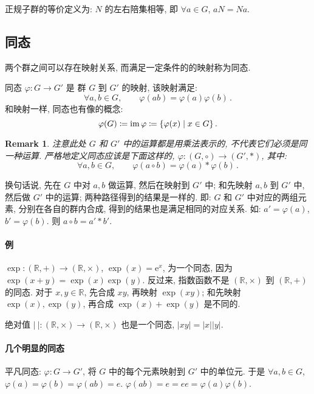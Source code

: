 \documentclass[UTF8]{ctexart}
\theoremstyle{mystyle}
\theoremstyle{myremark}
\newtheorem*{remark}{Remark}
\theoremstyle{plain}
\newcommand{\mr}{\mathrm}
\newcommand{\R}{\mathbb R}
\DeclareMathOperator{\im}{im}
\DeclarePairedDelimiter\set{\{}{\}}
\begin{document}
正规子群的等价定义为: $ N $ 的左右陪集相等, 即 $ \forall a \in G $, $ aN = Na $.

\subsection{同态}
两个群之间可以存在映射关系, 而满足一定条件的的映射称为同态.
\begin{definition}
    同态 $ \varphi \colon G \to G' $ 是 群 $ G $ 到 $ G' $ 的映射, 该映射满足:
    \[ \forall a, b \in G, \qquad \varphi(a b) = \varphi(a) \varphi(b) \,.\]
    和映射一样, 同态也有像的概念:
    \[ \varphi(G) \coloneqq \im \varphi \coloneqq \set{\varphi(x) \mid x \in G} \,.\]
\end{definition}

\begin{remark}
    注意此处 $ G $ 和 $ G' $ 中的运算都是用乘法表示的, 不代表它们必须是同一种运算. 严格地定义同态应该是下面这样的, $ \varphi \colon (G, \circ) \to (G', *) $, 其中:
    \[ \forall a, b \in G, \qquad \varphi(a \circ b) = \varphi(a) * \varphi(b) \,.\]
\end{remark}

换句话说, 先在 $ G $ 中对 $ a, b $ 做运算, 然后在映射到 $ G' $ 中; 和先映射 $ a, b $ 到 $ G' $ 中, 然后做 $ G' $ 中的运算; 两种路径得到的结果是一样的. 即: $ G $ 和 $ G' $ 中对应的两组元素, 分别在各自的群内合成, 得到的结果也是满足相同的对应关系. 如: $ a' = \varphi(a) $, $ b' = \varphi(b) $. 则 $ a \circ b = a' * b' $.

\paragraph{例}
$ \exp \colon (\R, +) \to (\R, \times) $, $ \exp(x) = \mr e^x $, 为一个同态, 因为 $ \exp(x + y) = \exp (x) \exp (y) $. 反过来, 指数函数不是 $ (\R, \times) $ 到 $ (\R, +) $ 的同态. 对于 $ x, y \in \R $, 先合成 $ x y $, 再映射 $ \exp (x y) $; 和先映射 $ \exp(x), \exp(y) $, 再合成 $ \exp(x) + \exp(y) $ 是不同的.

绝对值 $ |~| \colon (\R, \times) \to (\R, \times) $ 也是一个同态, $ |x y| = |x| |y| $.

\paragraph{几个明显的同态}
平凡同态: $ \varphi \colon G \to G' $, 将 $ G $ 中的每个元素映射到 $ G' $ 中的单位元. 于是 $ \forall a, b \in G $, $ \varphi(a) = \varphi(b) = \varphi(a b) = e $. $ \varphi(a b) = e = ee = \varphi(a) \varphi(b) $.
\end{document}
